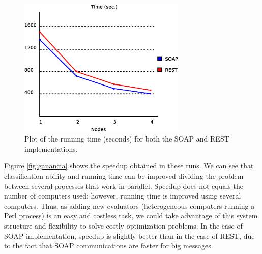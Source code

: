 \documentclass[final,1p,times]{elsarticle}
\begin{document}
\begin{figure}[!ht]
\begin{center}
\includegraphics[width=8cm]{exp3_time.eps}
\caption{Plot of the running time (seconds) for both the SOAP and REST implementations. 
 }
\label{fig:resultados3time}
\end{center}
\end{figure}


Figure \ref{fig:ganancia} shows the speedup obtained in these runs. 
We can see that classification ability and running time can be improved dividing the problem between several processes that work in parallel.
Speedup does not equals the number of computers used; however, running time is improved using several computers. 
Thus, as adding new evaluators (heterogeneous computers running a Perl process) is an easy and costless task, we could take advantage of this system structure and flexibility to solve costly optimization problems.
In the case of SOAP implementation, speedup is slightly better than in the case of REST, due to the fact that SOAP communications are faster for big messages.
\end{document}
